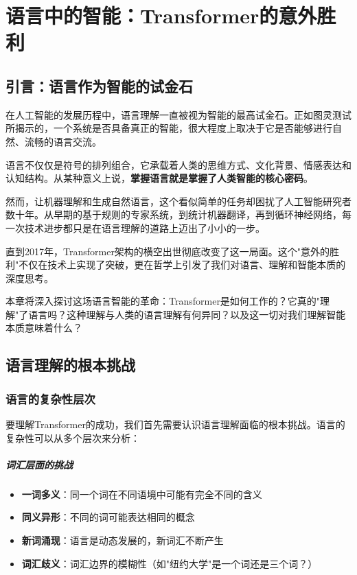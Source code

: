 \chapter{语言中的智能：Transformer的意外胜利}

\section{引言：语言作为智能的试金石}

在人工智能的发展历程中，语言理解一直被视为智能的最高试金石。正如图灵测试所揭示的，一个系统是否具备真正的智能，很大程度上取决于它是否能够进行自然、流畅的语言交流。

语言不仅仅是符号的排列组合，它承载着人类的思维方式、文化背景、情感表达和认知结构。从某种意义上说，\textbf{掌握语言就是掌握了人类智能的核心密码}。

然而，让机器理解和生成自然语言，这个看似简单的任务却困扰了人工智能研究者数十年。从早期的基于规则的专家系统，到统计机器翻译，再到循环神经网络，每一次技术进步都只是在语言理解的道路上迈出了小小的一步。

直到2017年，Transformer架构的横空出世彻底改变了这一局面。这个"意外的胜利"不仅在技术上实现了突破，更在哲学上引发了我们对语言、理解和智能本质的深度思考。

本章将深入探讨这场语言智能的革命：Transformer是如何工作的？它真的"理解"了语言吗？这种理解与人类的语言理解有何异同？以及这一切对我们理解智能本质意味着什么？

\section{语言理解的根本挑战}

\subsection{语言的复杂性层次}

要理解Transformer的成功，我们首先需要认识语言理解面临的根本挑战。语言的复杂性可以从多个层次来分析：

\paragraph{词汇层面的挑战}
\begin{itemize}
\item \textbf{一词多义}：同一个词在不同语境中可能有完全不同的含义
\item \textbf{同义异形}：不同的词可能表达相同的概念
\item \textbf{新词涌现}：语言是动态发展的，新词汇不断产生
\item \textbf{词汇歧义}：词汇边界的模糊性（如"纽约大学"是一个词还是三个词？）
\end{itemize}

